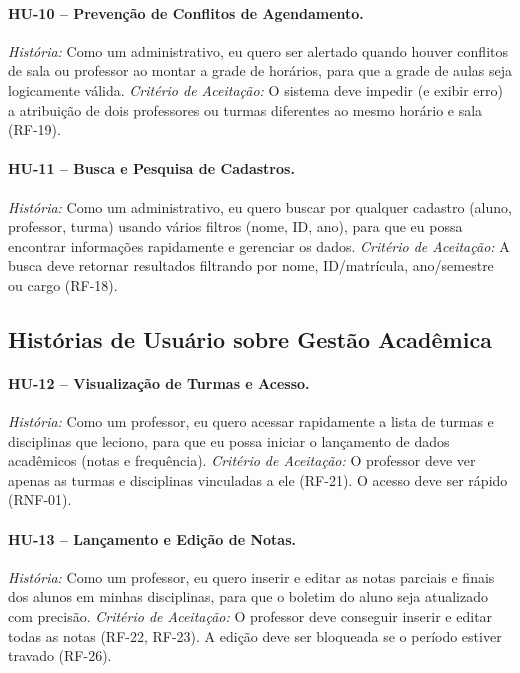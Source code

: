 \paragraph{HU-10 -- Prevenção de Conflitos de Agendamento.}
\textit{História:} Como um administrativo, eu quero ser alertado quando
houver conflitos de sala ou professor ao montar a grade de horários, para
que a grade de aulas seja logicamente válida.
\textit{Critério de Aceitação:} O sistema deve impedir (e exibir erro) a
atribuição de dois professores ou turmas diferentes ao mesmo horário e sala
(RF-19).

\paragraph{HU-11 -- Busca e Pesquisa de Cadastros.}
\textit{História:} Como um administrativo, eu quero buscar por qualquer
cadastro (aluno, professor, turma) usando vários filtros (nome, ID, ano),
para que eu possa encontrar informações rapidamente e gerenciar os dados.
\textit{Critério de Aceitação:} A busca deve retornar resultados filtrando
por nome, ID/matrícula, ano/semestre ou cargo (RF-18).

\subsection{Histórias de Usuário sobre Gestão Acadêmica}

\paragraph{HU-12 -- Visualização de Turmas e Acesso.}
\textit{História:} Como um professor, eu quero acessar rapidamente a lista
de turmas e disciplinas que leciono, para que eu possa iniciar o
lançamento de dados acadêmicos (notas e frequência).
\textit{Critério de Aceitação:} O professor deve ver apenas as turmas e
disciplinas vinculadas a ele (RF-21). O acesso deve ser rápido (RNF-01).

\paragraph{HU-13 -- Lançamento e Edição de Notas.}
\textit{História:} Como um professor, eu quero inserir e editar as notas
parciais e finais dos alunos em minhas disciplinas, para que o boletim do
aluno seja atualizado com precisão.
\textit{Critério de Aceitação:} O professor deve conseguir inserir e editar
todas as notas (RF-22, RF-23). A edição deve ser bloqueada se o período
estiver travado (RF-26).

